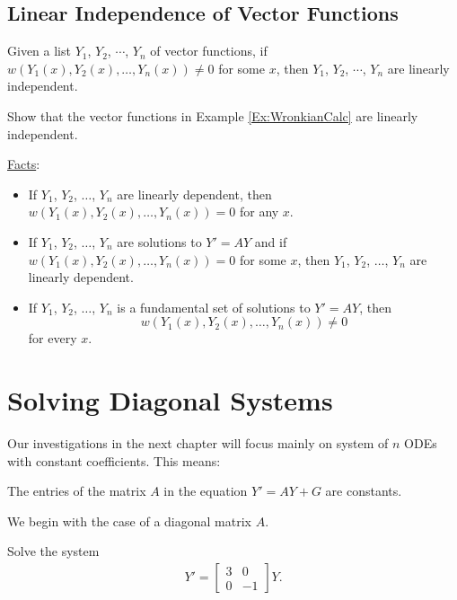\documentclass[12pt,a4paper]{article}
\newcounter{example}[section]
\begin{document}
	
	\newpage
	
	\subsection{Linear Independence of Vector Functions}
	Given a list $Y_1$, $Y_2$, $\cdots$, $Y_n$ of vector functions, if $w (Y_1 (x) , Y_2 (x) , \ldots , Y_n (x)) \neq 0$ for some $x$, then $Y_1$, $Y_2$, $\cdots$, $Y_n$ are linearly independent.
	
	\vspace*{14pt}
	
	\begin{example}
	Show that the vector functions in Example \ref{Ex:WronkianCalc} are linearly independent.
	\end{example}
	
	\vfill
	
	\underline{Facts}:
		\begin{itemize}
		\item If $Y_1$, $Y_2$, $\ldots$, $Y_n$ are linearly dependent, then $w (Y_1 (x) , Y_2 (x) , \ldots , Y_n (x)) = 0$ for any $x$.
		\item If $Y_1$, $Y_2$, $\ldots$, $Y_n$ are solutions to $Y' = AY$ and if $w (Y_1(x) , Y_2(x) , \ldots , Y_n (x)) = 0$ for some $x$, then $Y_1$, $Y_2$, $\ldots$, $Y_n$ are linearly dependent.
		\item If $Y_1$, $Y_2$, $\ldots$, $Y_n$ is a fundamental set of solutions to $Y' = AY$, then 
		$$
		w(Y_1(x) , Y_2 (x) , \ldots , Y_n (x) ) \neq 0
		$$
	for every $x$.
		\end{itemize}
		
\newpage

\section{Solving Diagonal Systems}
Our investigations in the next chapter will focus mainly on system of $n$ ODEs with constant coefficients. This means:
	\begin{center}
	The entries of the matrix $A$ in the equation $Y' = AY + G$ are constants.
	\end{center}
	
We begin with the case of a diagonal matrix $A$.

\vspace*{14pt}

	\begin{example}
	Solve the system
		\begin{align*}
		Y' = \begin{bmatrix}
		3 & 0 \\ 0 & -1
		\end{bmatrix} Y .
		\end{align*}
	\end{example}
	
\end{document}
